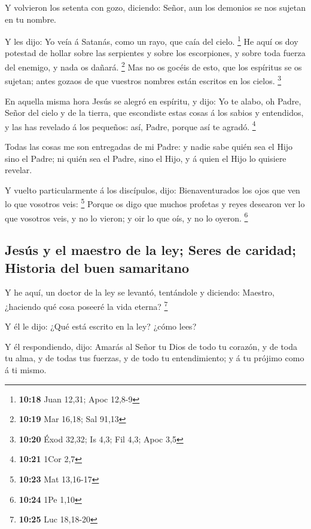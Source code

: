  Y volvieron los setenta con gozo, diciendo: Señor, aun
los demonios se nos sujetan en tu nombre.

 Y les dijo: Yo veía á Satanás, como un rayo, que caía
del cielo. \footnote{\textbf{10:18} Juan 12,31; Apoc 12,8-9}
 He aquí os doy potestad de hollar sobre las serpientes y
sobre los escorpiones, y sobre toda fuerza del enemigo, y nada os
dañará. \footnote{\textbf{10:19} Mar 16,18; Sal 91,13} 
Mas no os gocéis de esto, que los espíritus se os sujetan; antes gozaos
de que vuestros nombres están escritos en los cielos. \footnote{\textbf{10:20}
  Éxod 32,32; Is 4,3; Fil 4,3; Apoc 3,5}

 En aquella misma hora Jesús se alegró en espíritu, y
dijo: Yo te alabo, oh Padre, Señor del cielo y de la tierra, que
escondiste estas cosas á los sabios y entendidos, y las has revelado á
los pequeños: así, Padre, porque así te agradó. \footnote{\textbf{10:21}
  1Cor 2,7}

 Todas las cosas me son entregadas de mi Padre: y nadie
sabe quién sea el Hijo sino el Padre; ni quién sea el Padre, sino el
Hijo, y á quien el Hijo lo quisiere revelar.

 Y vuelto particularmente á los discípulos, dijo:
Bienaventurados los ojos que ven lo que vosotros veis: \footnote{\textbf{10:23}
  Mat 13,16-17}  Porque os digo que muchos profetas y
reyes desearon ver lo que vosotros veis, y no lo vieron; y oir lo que
oís, y no lo oyeron. \footnote{\textbf{10:24} 1Pe 1,10}

\hypertarget{jesuxfas-y-el-maestro-de-la-ley-seres-de-caridad-historia-del-buen-samaritano}{%
\subsection{Jesús y el maestro de la ley; Seres de caridad; Historia del
buen
samaritano}\label{jesuxfas-y-el-maestro-de-la-ley-seres-de-caridad-historia-del-buen-samaritano}}

 Y he aquí, un doctor de la ley se levantó, tentándole y
diciendo: Maestro, ¿haciendo qué cosa poseeré la vida eterna?
\footnote{\textbf{10:25} Luc 18,18-20}

 Y él le dijo: ¿Qué está escrito en la ley? ¿cómo lees?

 Y él respondiendo, dijo: Amarás al Señor tu Dios de todo
tu corazón, y de toda tu alma, y de todas tus fuerzas, y de todo tu
entendimiento; y á tu prójimo como á ti mismo.


